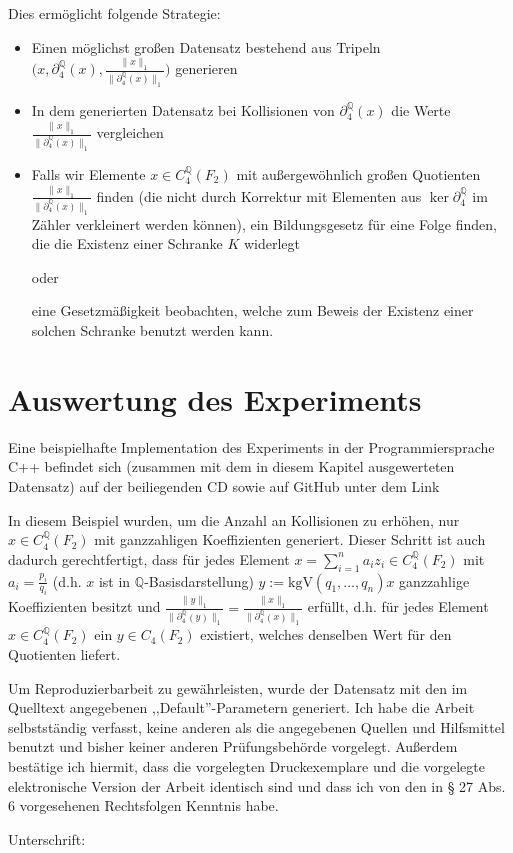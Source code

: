 \documentclass[a4paper,twoside,10pt]{scrreprt}
\newcommand{\Q}{\mathbb{Q}}
\theoremstyle{definition}
\begin{document}
Dies ermöglicht folgende Strategie: 
\begin{itemize}
\item Einen möglichst großen Datensatz bestehend aus Tripeln $\biggl(x,\partial_4^{\Q}(x),\frac{\|x\|_1}{\|\partial_4^{\Q}(x)\|_1}\biggr)$ generieren
\item In dem generierten Datensatz bei Kollisionen von $\partial_4^{\Q}(x)$ die Werte $\frac{\|x\|_1}{\|\partial_4^{\Q}(x)\|_1}$ vergleichen
\item Falls wir Elemente $x\in C_4^{\Q}(F_2)$ mit außergewöhnlich großen Quotienten $\frac{\|x\|_1}{\|\partial_4^{\Q}(x)\|_1}$ finden (die nicht durch Korrektur mit Elementen aus $\ker\partial_4^{\Q}$ im Zähler verkleinert werden können), ein Bildungsgesetz für eine Folge finden, die die Existenz einer Schranke $K$ widerlegt \par oder \par eine Gesetzmäßigkeit beobachten, welche zum Beweis der Existenz einer solchen Schranke benutzt werden kann.
\end{itemize}
\chapter{Auswertung des Experiments}
Eine beispielhafte Implementation des Experiments in der Programmiersprache C++ befindet sich (zusammen mit dem in diesem Kapitel ausgewerteten Datensatz) auf der beiliegenden CD sowie auf  GitHub unter dem Link %
\par
In diesem Beispiel wurden, um die Anzahl an Kollisionen zu erhöhen, nur $x\in C_4^{\Q}(F_2)$ mit ganzzahligen Koeffizienten generiert. Dieser Schritt ist auch dadurch gerechtfertigt, dass für jedes Element $x=\sum\limits_{i=1}^na_iz_i\in C_4^{\Q}(F_2)$ mit $a_i=\frac{p_i}{q_i}$ (d.h. $x$ ist in $\Q$-Basisdarstellung) $y:=\text{kgV}(q_1,\ldots,q_n)x$ ganzzahlige Koeffizienten besitzt und $\frac{\|y\|_1}{\|\partial_4^{\Q}(y)\|_1}=\frac{\|x\|_1}{\|\partial_4^{\Q}(x)\|_1}$ erfüllt, d.h. für jedes Element $x\in C_4^{\Q}(F_2)$ ein $y\in C_4(F_2)$ existiert, welches denselben Wert für den Quotienten liefert.\par 
Um Reproduzierbarbeit zu gewährleisten, wurde der Datensatz mit den im Quelltext angegebenen ,,Default''-Parametern generiert.
\nocite{loeha}
\nocite{loehb}
\nocite{frigerio}
\printbibliography
\newpage
\cleardoublepage
\pagestyle{empty}
\noindent
Ich habe die Arbeit selbstständig verfasst, keine anderen als die angegebenen Quellen und Hilfsmittel benutzt und bisher keiner anderen Prüfungsbehörde vorgelegt. Außerdem bestätige ich hiermit, dass die vorgelegten Druckexemplare und die vorgelegte elektronische Version der Arbeit identisch sind und dass ich von den in § 27 Abs. 6 vorgesehenen Rechtsfolgen Kenntnis habe.\par\hfill\par\noindent
Unterschrift:\hspace{0.5cm} \makebox[1.5in]{\hrulefill}
\end{document}
